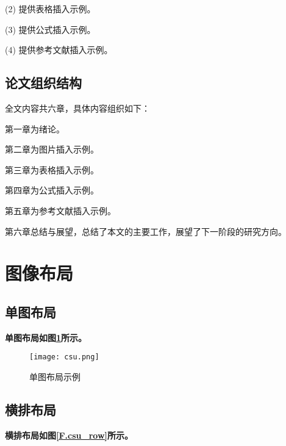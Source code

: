 (2) 提供表格插入示例。

(3) 提供公式插入示例。

(4) 提供参考文献插入示例。

\subsection{论文组织结构}

全文内容共六章，具体内容组织如下：

第一章为绪论。

第二章为图片插入示例。

第三章为表格插入示例。

第四章为公式插入示例。

第五章为参考文献插入示例。

第六章总结与展望，总结了本文的主要工作，展望了下一阶段的研究方向。

\newpage

\section{图像布局}


\subsection{单图布局}



\textbf{单图布局如图\ref{F.csu_single}所示。}

\begin{figure}[hbt]
\centering
\texttt{[image: csu.png]}
\caption{单图布局示例}
\label{F.csu_single}
\end{figure}

\subsection{横排布局}

\textbf{横排布局如图\ref{F.csu_row}所示。}

